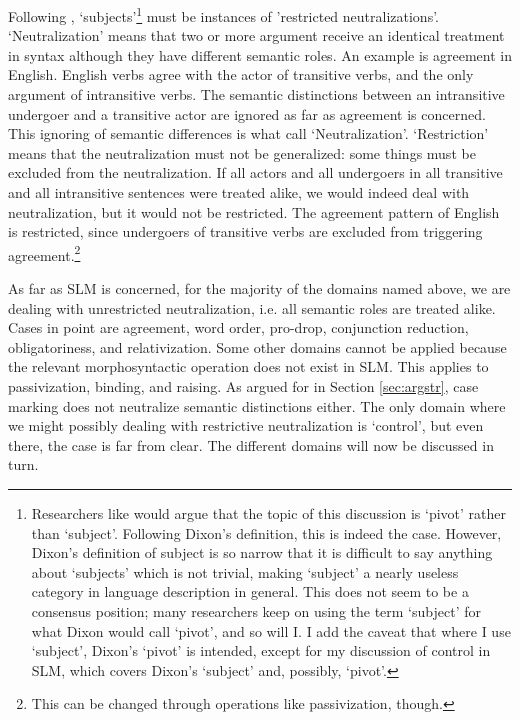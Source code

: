 Following \citet[250ff]{VanValinEtAl1997rrg}, `subjects'\footnote{Researchers
 like \citet{Dixon1979,Dixon1994} would argue that the topic of this discussion is `pivot' rather than `subject'. Following Dixon's definition, this is indeed the case. However, Dixon's definition of subject is so narrow that it is difficult to say anything about `subjects' which is not trivial, making `subject' a nearly useless category in language description in general. This does not seem to be a consensus position; many researchers \citep[e.g.][104ff]{Comrie1981} keep on using the term `subject' for what Dixon would call `pivot', and so will I. I add the caveat that where I use `subject', Dixon's `pivot' is intended, except for my discussion of control in SLM, which covers  Dixon's `subject' and, possibly, `pivot'.}
must be instances of 'restricted neutralizations'. `Neutralization' means  that two or more argument receive an identical treatment in syntax although they have different semantic roles. An example is agreement in English. English verbs agree with the actor of transitive verbs, and the only argument of intransitive verbs. The semantic distinctions between an intransitive undergoer and a transitive actor are ignored as far as agreement is concerned. This ignoring of semantic differences is what \citet{VanValinEtAl1997rrg} call `Neutralization'. `Restriction' means that the neutralization must not be generalized: some things must be excluded from the neutralization. If all actors and all undergoers in all transitive and all intransitive sentences were treated alike, we would indeed deal with neutralization, but it would not be restricted. The agreement pattern of English is restricted, since  undergoers of transitive verbs are excluded from triggering agreement.\footnote{This can be changed through operations like passivization, though.}

As far as SLM is concerned, for the majority of the domains named above, we are dealing with unrestricted neutralization, i.e. all semantic roles are treated alike. Cases in point are agreement, word order, pro-drop, conjunction reduction, obligatoriness, and relativization. Some other domains cannot be applied because the relevant morphosyntactic operation does not exist in SLM. This applies to passivization, binding, and raising. As argued for in Section \ref{sec:argstr}, case marking does not neutralize semantic distinctions either. The only domain where we might possibly dealing with restrictive neutralization is `control', but even there, the case is far from clear. The different domains will now be discussed in turn.

